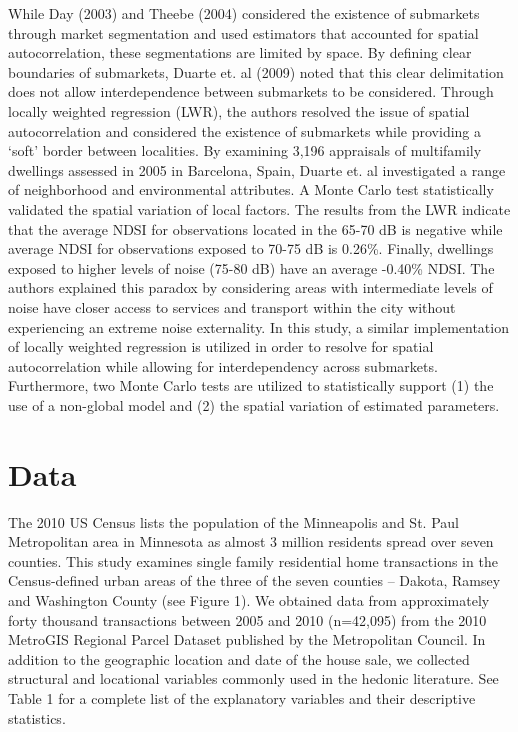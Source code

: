 \documentclass{article}\usepackage{graphicx, color}
\begin{document}
While Day (2003) and Theebe (2004) considered the existence of submarkets through market segmentation and used estimators that accounted for spatial autocorrelation, these segmentations are limited by space. By defining clear boundaries of submarkets, Duarte et. al (2009) noted that this clear delimitation does not allow interdependence between submarkets to be considered. Through locally weighted regression (LWR), the authors resolved the issue of spatial autocorrelation and considered the existence of submarkets while providing a ‘soft’ border between localities. By examining 3,196 appraisals of multifamily dwellings assessed in 2005 in Barcelona, Spain, Duarte et. al investigated a range of neighborhood and environmental attributes.  A Monte Carlo test statistically validated the spatial variation of local factors. The results from the LWR indicate that the average NDSI for observations located in the 65-70 dB is negative  while average NDSI for observations exposed to 70-75 dB is 0.26\%. Finally, dwellings exposed to higher levels of noise (75-80 dB) have an average -0.40\% NDSI. The authors explained this paradox by considering areas with intermediate levels of noise have closer access to services and transport within the city without experiencing an extreme noise externality. In this study, a similar implementation of locally weighted regression is utilized in order to resolve for spatial autocorrelation while allowing for interdependency across submarkets. Furthermore, two Monte Carlo tests are utilized to statistically support (1) the use of a non-global model and (2) the spatial variation of estimated parameters. 

\section{Data}
The 2010 US Census lists the population of the Minneapolis and St. Paul Metropolitan area in Minnesota as almost 3 million residents spread over seven counties. This study examines single family residential home transactions in the Census-defined urban areas of the three of the seven counties – Dakota, Ramsey and Washington County (see Figure 1). We obtained data from approximately forty thousand transactions between 2005 and 2010 (n=42,095) from the 2010 MetroGIS Regional Parcel Dataset published by the Metropolitan Council. In addition to the geographic location and date of the house sale, we collected structural and locational variables commonly used in the hedonic literature. See Table 1 for a complete list of the explanatory variables and their descriptive statistics. 
\end{document}
